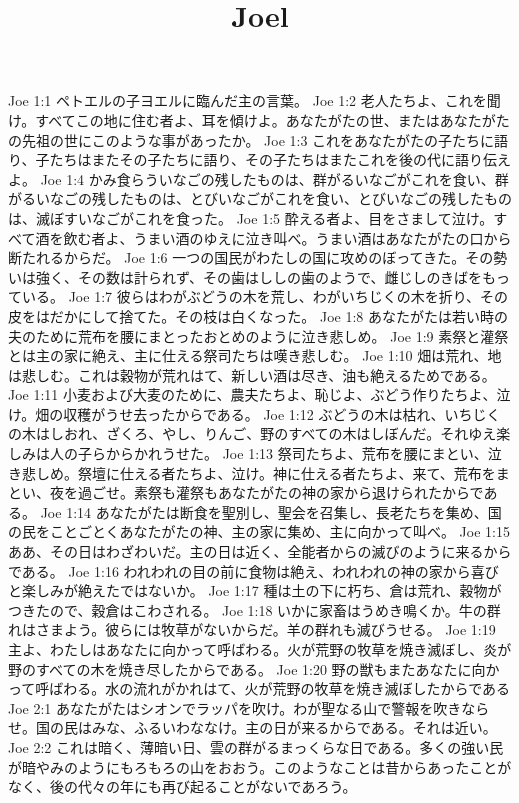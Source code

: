 

\title{Joel}

Joe 1:1  ペトエルの子ヨエルに臨んだ主の言葉。
Joe 1:2  老人たちよ、これを聞け。すべてこの地に住む者よ、耳を傾けよ。あなたがたの世、またはあなたがたの先祖の世にこのような事があったか。
Joe 1:3  これをあなたがたの子たちに語り、子たちはまたその子たちに語り、その子たちはまたこれを後の代に語り伝えよ。
Joe 1:4  かみ食らういなごの残したものは、群がるいなごがこれを食い、群がるいなごの残したものは、とびいなごがこれを食い、とびいなごの残したものは、滅ぼすいなごがこれを食った。
Joe 1:5  酔える者よ、目をさまして泣け。すべて酒を飲む者よ、うまい酒のゆえに泣き叫べ。うまい酒はあなたがたの口から断たれるからだ。
Joe 1:6  一つの国民がわたしの国に攻めのぼってきた。その勢いは強く、その数は計られず、その歯はししの歯のようで、雌じしのきばをもっている。
Joe 1:7  彼らはわがぶどうの木を荒し、わがいちじくの木を折り、その皮をはだかにして捨てた。その枝は白くなった。
Joe 1:8  あなたがたは若い時の夫のために荒布を腰にまとったおとめのように泣き悲しめ。
Joe 1:9  素祭と灌祭とは主の家に絶え、主に仕える祭司たちは嘆き悲しむ。
Joe 1:10  畑は荒れ、地は悲しむ。これは穀物が荒れはて、新しい酒は尽き、油も絶えるためである。
Joe 1:11  小麦および大麦のために、農夫たちよ、恥じよ、ぶどう作りたちよ、泣け。畑の収穫がうせ去ったからである。
Joe 1:12  ぶどうの木は枯れ、いちじくの木はしおれ、ざくろ、やし、りんご、野のすべての木はしぼんだ。それゆえ楽しみは人の子らからかれうせた。
Joe 1:13  祭司たちよ、荒布を腰にまとい、泣き悲しめ。祭壇に仕える者たちよ、泣け。神に仕える者たちよ、来て、荒布をまとい、夜を過ごせ。素祭も灌祭もあなたがたの神の家から退けられたからである。
Joe 1:14  あなたがたは断食を聖別し、聖会を召集し、長老たちを集め、国の民をことごとくあなたがたの神、主の家に集め、主に向かって叫べ。
Joe 1:15  ああ、その日はわざわいだ。主の日は近く、全能者からの滅びのように来るからである。
Joe 1:16  われわれの目の前に食物は絶え、われわれの神の家から喜びと楽しみが絶えたではないか。
Joe 1:17  種は土の下に朽ち、倉は荒れ、穀物がつきたので、穀倉はこわされる。
Joe 1:18  いかに家畜はうめき鳴くか。牛の群れはさまよう。彼らには牧草がないからだ。羊の群れも滅びうせる。
Joe 1:19  主よ、わたしはあなたに向かって呼ばわる。火が荒野の牧草を焼き滅ぼし、炎が野のすべての木を焼き尽したからである。
Joe 1:20  野の獣もまたあなたに向かって呼ばわる。水の流れがかれはて、火が荒野の牧草を焼き滅ぼしたからである
Joe 2:1  あなたがたはシオンでラッパを吹け。わが聖なる山で警報を吹きならせ。国の民はみな、ふるいわななけ。主の日が来るからである。それは近い。
Joe 2:2  これは暗く、薄暗い日、雲の群がるまっくらな日である。多くの強い民が暗やみのようにもろもろの山をおおう。このようなことは昔からあったことがなく、後の代々の年にも再び起ることがないであろう。
